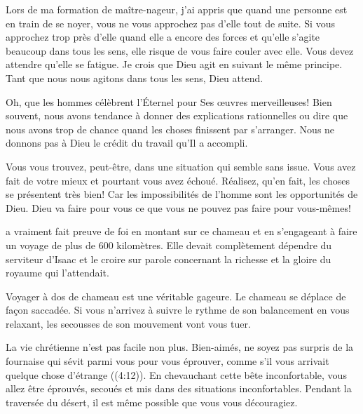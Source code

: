 Lors de ma formation de maître-nageur, j'ai appris que quand une personne
 est en train de se noyer, vous ne vous approchez pas d'elle tout de suite.
 Si vous approchez trop près d'elle quand elle a encore des forces
 et qu'elle s'agite beaucoup dans tous les sens,
 elle risque de vous faire couler avec elle.
 Vous devez attendre qu'elle se fatigue.
 Je crois que Dieu agit en suivant le même principe.
 Tant que nous nous agitons dans tous les sens, Dieu attend. 


\og Oh, que les hommes célèbrent l'Éternel pour
 Ses œuvres merveilleuses! \fg{}
 Bien souvent, nous avons tendance à donner des explications rationnelles
 ou dire que nous avons trop de chance quand les choses finissent
 par s'arranger.
 Nous ne donnons pas à Dieu le crédit du travail qu'Il a accompli. 

Vous vous trouvez, peut-être, dans une situation qui semble sans issue.
 Vous avez fait de votre mieux et pourtant vous avez échoué.
 Réalisez, qu'en fait, les choses se présentent très bien!
 Car les impossibilités de l'homme sont les opportunités de Dieu.
 Dieu va faire pour vous ce que vous ne pouvez pas faire pour vous-mêmes! 

\dvrule






 a vraiment fait preuve de foi
 en montant sur ce chameau et en s'engageant à faire un voyage
 de plus de 600 kilomètres.
 Elle devait complètement dépendre du serviteur d'Isaac
 et le croire sur parole concernant la richesse
 et la gloire du royaume qui l'attendait. 

Voyager à dos de chameau est une véritable gageure.
 Le chameau se déplace de façon saccadée.
 Si vous n'arrivez à suivre le rythme de son balancement
 en vous relaxant, les secousses de son mouvement vont vous tuer.

La vie chrétienne n'est pas facile non plus.
 \og Bien-aimés, ne soyez pas surpris de la fournaise qui sévit
 parmi vous pour vous éprouver, comme s'il vous arrivait
 quelque chose d'étrange \fg{} ((4:12)).
 En chevauchant cette bête inconfortable, vous allez être éprouvés,
 secoués et mis dans des situations inconfortables.
 Pendant la traversée du désert,
 il est même possible que vous vous découragiez. 

